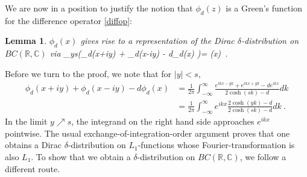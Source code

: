 \documentclass[12pt]{article}
\theoremstyle{plain}
\newtheorem{lemma}[theorem]{Lemma}
\theoremstyle{definition}
\numberwithin{equation}{section}
\numberwithin{theorem}{section}
\def\be#1\ee{\begin{equation}#1\end{equation}}
\begin{document}
We are now in a position to justify the notion that $\phi_d(z)$ is a Green's function for the difference operator \eqref{diffop}:

\begin{lemma} \label{Greensproperty} $\phi_d(x)$ gives rise to a representation of the Dirac $\delta$-distribution on $BC(\mathbb{R},\mathbb{C})$ via
\be
\lim_{y\nearrow  s}\left(\phi_d(x+iy) + \phi_d(x-iy) - d\phi_d(x) \right)= \delta(x)\ .
\ee
\end{lemma}

Before we turn to the proof, we note that for $|y|<s$, 
\begin{align}
\phi_d(x+iy) + \phi_d(x-iy) - d\phi_d(x) &= \frac{1}{2\pi}\int_{-\infty}^{\infty} \frac{e^{ikx-yk}+e^{ikx+yk}-de^{ikx}}{2\cosh(sk)-d}dk \nonumber\\
&=\frac{1}{2\pi}\int_{-\infty}^{\infty}e^{ikx} \frac{2\cosh(yk)-d}{2\cosh(sk)-d}dk\ .
\end{align}
In the limit $y\nearrow s$, the integrand on the right hand side approaches $e^{ikx}$ pointwise. The usual exchange-of-integration-order argument proves that one obtains a Dirac $\delta$-distribution on $L_1$-functions whose Fourier-transformation is also $L_1$. To show that we obtain a $\delta$-distribution on $BC(\mathbb{R},\mathbb{C})$, we follow a different route.
\end{document}
